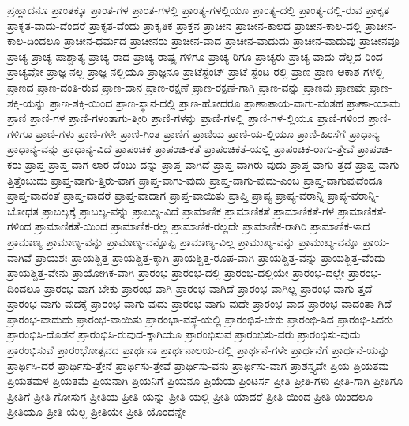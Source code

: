 {ಪ್ರಹ್ಲಾದನೂ
ಪ್ರಾಂತಕ್ಕೂ
ಪ್ರಾಂತ-ಗಳ
ಪ್ರಾಂತ-ಗಳಲ್ಲಿ
ಪ್ರಾಂತ್ಯ-ಗಳಲ್ಲಿಯೂ
ಪ್ರಾಂತ್ಯ-ದಲ್ಲಿ
ಪ್ರಾಂತ್ಯ-ದಲ್ಲಿ-ರುವ
ಪ್ರಾಕೃತ
ಪ್ರಾಕೃತ-ವಾದು-ದೆಂದರೆ
ಪ್ರಾಕೃತ-ವೆಂದು
ಪ್ರಾಕೃತಿಕ
ಪ್ರಾಕ್ತನ
ಪ್ರಾಚೀನ
ಪ್ರಾಚೀನ-ಕಾಲದ
ಪ್ರಾಚೀನ-ಕಾಲ-ದಲ್ಲಿ
ಪ್ರಾಚೀನ-ಕಾಲ-ದಿಂದಲೂ
ಪ್ರಾಚೀನ-ಧರ್ಮದ
ಪ್ರಾಚೀನರು
ಪ್ರಾಚೀನ-ವಾದ
ಪ್ರಾಚೀನ-ವಾದುದು
ಪ್ರಾಚೀನ-ವಾದುವು
ಪ್ರಾಚೀನವೂ
ಪ್ರಾಚ್ಯ
ಪ್ರಾಚ್ಯ-ಪಾಶ್ಚಾತ್ಯ
ಪ್ರಾಚ್ಯ-ರಾದ
ಪ್ರಾಚ್ಯ-ರಾಷ್ಟ್ರ-ಗಳಿಗೂ
ಪ್ರಾಚ್ಯ-ರಿಗೂ
ಪ್ರಾಚ್ಯರು
ಪ್ರಾಚ್ಯ-ವಾದು-ದೆಲ್ಲದ-ರಿಂದ
ಪ್ರಾಚ್ಯವೋ
ಪ್ರಾಜ್ಞ-ನಲ್ಲ
ಪ್ರಾಜ್ಞ-ನಲ್ಲಿಯೂ
ಪ್ರಾಜ್ಞನೂ
ಪ್ರಾಟೆಸ್ಟೆಂಟ್
ಪ್ರಾಟೆ-ಸ್ಟೆಂಟ-ರಲ್ಲಿ
ಪ್ರಾಣ
ಪ್ರಾಣ-ಆಕಾಶ-ಗಳಲ್ಲಿ
ಪ್ರಾಣದ
ಪ್ರಾಣ-ದಂತಿ-ರುವ
ಪ್ರಾಣ-ದಾನ
ಪ್ರಾಣ-ರಕ್ಷಣೆ
ಪ್ರಾಣ-ರಕ್ಷಣೆ-ಗಾಗಿ
ಪ್ರಾಣ-ವನ್ನು
ಪ್ರಾಣವು
ಪ್ರಾಣವೇ
ಪ್ರಾಣ-ಶಕ್ತಿ-ಯನ್ನು
ಪ್ರಾಣ-ಶಕ್ತಿ-ಯಿಂದ
ಪ್ರಾಣ-ಸ್ಥಾನ-ದಲ್ಲಿ
ಪ್ರಾಣ-ಹೋದರೂ
ಪ್ರಾಣಾಪಾಯ-ವಾಗು-ವಂತಹ
ಪ್ರಾಣಾ-ಯಾಮ
ಪ್ರಾಣಿ
ಪ್ರಾಣಿ-ಗಳ
ಪ್ರಾಣಿ-ಗಳಂತಾಗು-ತ್ತೀರಿ
ಪ್ರಾಣಿ-ಗಳನ್ನು
ಪ್ರಾಣಿ-ಗಳಲ್ಲಿ
ಪ್ರಾಣಿ-ಗಳ-ಲ್ಲಿಯೂ
ಪ್ರಾಣಿ-ಗಳಿಂದ
ಪ್ರಾಣಿ-ಗಳಿಗೂ
ಪ್ರಾಣಿ-ಗಳು
ಪ್ರಾಣಿ-ಗಳೇ
ಪ್ರಾಣಿ-ಗಿಂತ
ಪ್ರಾಣಿಗೆ
ಪ್ರಾಣಿಯ
ಪ್ರಾಣಿ-ಯ-ಲ್ಲಿಯೂ
ಪ್ರಾಣಿ-ಹಿಂಸೆಗೆ
ಪ್ರಾಧಾನ್ಯ
ಪ್ರಾಧಾನ್ಯ-ವನ್ನು
ಪ್ರಾಧಾನ್ಯ-ವಿದೆ
ಪ್ರಾಪಂಚಿಕ
ಪ್ರಾಪಂಚಿ-ಕತೆ
ಪ್ರಾಪಂಚಿಕತೆ-ಯಲ್ಲಿ
ಪ್ರಾಪಂಚಿಕ-ರಾಗು-ತ್ತೇವೆ
ಪ್ರಾಪಂಚಿ-ಕರು
ಪ್ರಾಪ್ತ
ಪ್ರಾಪ್ತ-ವಾಗ-ಲಾರ-ದೆಂಬು-ದನ್ನು
ಪ್ರಾಪ್ತ-ವಾಗಿದೆ
ಪ್ರಾಪ್ತ-ವಾಗಿರು-ವುದು
ಪ್ರಾಪ್ತ-ವಾಗು-ತ್ತದೆ
ಪ್ರಾಪ್ತ-ವಾಗು-ತ್ತಿತ್ತೆಂಬುದು
ಪ್ರಾಪ್ತ-ವಾಗು-ತ್ತಿರು-ವಾಗ
ಪ್ರಾಪ್ತ-ವಾಗು-ವುದು
ಪ್ರಾಪ್ತ-ವಾಗು-ವುದು-ಎಂಬ
ಪ್ರಾಪ್ತ-ವಾಗುವುದೆಂದೂ
ಪ್ರಾಪ್ತ-ವಾದಂತೆ
ಪ್ರಾಪ್ತ-ವಾದರೆ
ಪ್ರಾಪ್ತ-ವಾದಾಗ
ಪ್ರಾಪ್ತ-ವಾಯಿತು
ಪ್ರಾಪ್ತಿ
ಪ್ರಾಪ್ಯ
ಪ್ರಾಪ್ಯ-ವರಾನ್ನಿ
ಪ್ರಾಪ್ಯ-ವರಾನ್ನಿ-ಬೋಧತ
ಪ್ರಾಬಲ್ಯಕ್ಕೆ
ಪ್ರಾಬಲ್ಯ-ವನ್ನು
ಪ್ರಾಬಲ್ಯ-ವಿದೆ
ಪ್ರಾಮಾಣಿಕ
ಪ್ರಾಮಾಣಿಕತೆ
ಪ್ರಾಮಾಣಿಕತೆ-ಗಳ
ಪ್ರಾಮಾಣಿಕತೆ-ಗಳಿಂದ
ಪ್ರಾಮಾಣಿಕತೆ-ಯಿಂದ
ಪ್ರಾಮಾಣಿಕ-ರಲ್ಲ
ಪ್ರಾಮಾಣಿಕ-ರಲ್ಲದೇ
ಪ್ರಾಮಾಣಿಕ-ರಾಗಿರಿ
ಪ್ರಾಮಾಣಿಕ-ಳಾದ
ಪ್ರಾಮಾಣ್ಯ
ಪ್ರಾಮಾಣ್ಯ-ವನ್ನು
ಪ್ರಾಮಾಣ್ಯ-ವನ್ನೊಪ್ಪಿ
ಪ್ರಾಮಾಣ್ಯ-ವಿಲ್ಲ
ಪ್ರಾಮುಖ್ಯ-ವನ್ನು
ಪ್ರಾಮುಖ್ಯ-ವನ್ನೂ
ಪ್ರಾಯ-ವಾಗಿವೆ
ಪ್ರಾಯಶಃ
ಪ್ರಾಯಶ್ಚಿತ್ತ
ಪ್ರಾಯಶ್ಚಿತ್ತ-ಕ್ಕಾಗಿ
ಪ್ರಾಯಶ್ಚಿತ್ತ-ರೂಪ-ವಾಗಿ
ಪ್ರಾಯಶ್ಚಿತ್ತ-ವನ್ನು
ಪ್ರಾಯಶ್ಚಿತ್ತ-ವೆಂದು
ಪ್ರಾಯಶ್ಚಿತ್ತ-ವೇನು
ಪ್ರಾಯೋಗಿಕ-ವಾಗಿ
ಪ್ರಾರಂಭ
ಪ್ರಾರಂಭ-ದಲ್ಲಿ
ಪ್ರಾರಂಭ-ದಲ್ಲಿಯೇ
ಪ್ರಾರಂಭ-ದಲ್ಲೇ
ಪ್ರಾರಂಭ-ದಿಂದಲೂ
ಪ್ರಾರಂಭ-ವಾಗ-ಬೇಕು
ಪ್ರಾರಂಭ-ವಾಗಿ
ಪ್ರಾರಂಭ-ವಾಗಿದೆ
ಪ್ರಾರಂಭ-ವಾಗಿಲ್ಲ
ಪ್ರಾರಂಭ-ವಾಗು-ತ್ತದೆ
ಪ್ರಾರಂಭ-ವಾಗು-ವುದಕ್ಕೆ
ಪ್ರಾರಂಭ-ವಾಗು-ವುದು
ಪ್ರಾರಂಭ-ವಾಗು-ವುದೇ
ಪ್ರಾರಂಭ-ವಾದ
ಪ್ರಾರಂಭ-ವಾದಂತಾ-ಗಿದೆ
ಪ್ರಾರಂಭ-ವಾದುದು
ಪ್ರಾರಂಭ-ವಾಯಿತು
ಪ್ರಾರಂಭಾ-ವಸ್ಥೆ-ಯಲ್ಲಿ
ಪ್ರಾರಂಭಿಸ-ಬೇಕು
ಪ್ರಾರಂಭಿ-ಸಿದ
ಪ್ರಾರಂಭಿ-ಸಿದರು
ಪ್ರಾರಂಭಿಸಿ-ದೊಡನೆ
ಪ್ರಾರಂಭಿಸಿ-ರುವುದ-ಕ್ಕಾಗಿಯೂ
ಪ್ರಾರಂಭಿಸುವ
ಪ್ರಾರಂಭಿಸು-ವರು
ಪ್ರಾರಂಭಿಸು-ವುದು
ಪ್ರಾರಂಭಿಸುವೆ
ಪ್ರಾರಂಭೋತ್ಸವದ
ಪ್ರಾರ್ಥನಾ
ಪ್ರಾರ್ಥನಾಲಯ-ದಲ್ಲಿ
ಪ್ರಾರ್ಥನೆ-ಗಳೇ
ಪ್ರಾರ್ಥನೆಗೆ
ಪ್ರಾರ್ಥನೆ-ಯನ್ನು
ಪ್ರಾರ್ಥಿಸಿ-ದರೆ
ಪ್ರಾರ್ಥಿಸು-ತ್ತೇನೆ
ಪ್ರಾರ್ಥಿಸು-ತ್ತೇವೆ
ಪ್ರಾರ್ಥಿಸು-ವನು
ಪ್ರಾರ್ಥಿಸು-ವಾಗ
ಪ್ರಾಶಸ್ತ್ಯವೇ
ಪ್ರಿಯ
ಪ್ರಿಯತಮ
ಪ್ರಿಯತಮಳ
ಪ್ರಿಯತಮೆ
ಪ್ರಿಯನಾಗಿ
ಪ್ರಿಯನಿಗೆ
ಪ್ರಿಯನೂ
ಪ್ರಿಯೆಯ
ಪ್ರಿಂಟರ್ಸ
ಪ್ರೀತಿ
ಪ್ರೀತಿ-ಗಳು
ಪ್ರೀತಿ-ಗಾಗಿ
ಪ್ರೀತಿಗೂ
ಪ್ರೀತಿಗೆ
ಪ್ರೀತಿ-ಗೋಸುಗ
ಪ್ರೀತಿಯ
ಪ್ರೀತಿ-ಯನ್ನು
ಪ್ರೀತಿ-ಯಲ್ಲಿ
ಪ್ರೀತಿ-ಯಾದರೆ
ಪ್ರೀತಿ-ಯಿಂದ
ಪ್ರೀತಿ-ಯಿಂದಲೂ
ಪ್ರೀತಿಯೂ
ಪ್ರೀತಿ-ಯೆಲ್ಲ
ಪ್ರೀತಿಯೇ
ಪ್ರೀತಿ-ಯೊಂದನ್ನೇ
}
